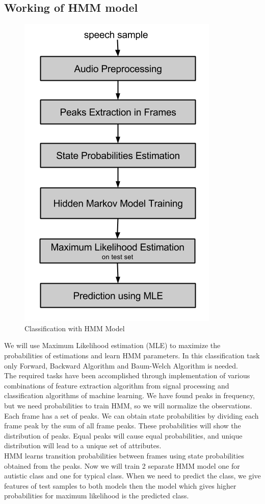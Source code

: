 \documentclass[11pt]{report}
\begin{document}
\subsection{Working of HMM model}
\begin{figure}[h]
\centering
\includegraphics[scale=.6]{./images/hmm_flow.png}
\caption{Classification with HMM Model}
\end{figure}
We will use Maximum Likelihood estimation (MLE) to maximize the probabilities of estimations and learn HMM parameters. In this classification task only Forward, Backward Algorithm and Baum-Welch Algorithm is needed.\\
The required tasks have been accomplished through implementation of various combinations of feature extraction algorithm from signal processing and classification algorithms of  machine learning. We have found peaks in frequency, but we need probabilities to train HMM, so we will normalize the observations. Each frame has a set of peaks. We can obtain state probabilities by dividing each frame peak by the sum of all frame peaks.
These probabilities will show the distribution of peaks. Equal peaks will cause equal probabilities, and unique distribution will lead to a unique set of attributes. \\
HMM learns transition probabilities between frames using state probabilities \cite{hmm} obtained from the peaks. Now we will train 2 separate HMM model one for autistic class and one for typical class. When we need to predict the class, we give features of test samples to both models then  the model which gives higher probabilities for maximum likelihood is the  predicted class. 
 
\end{document}
